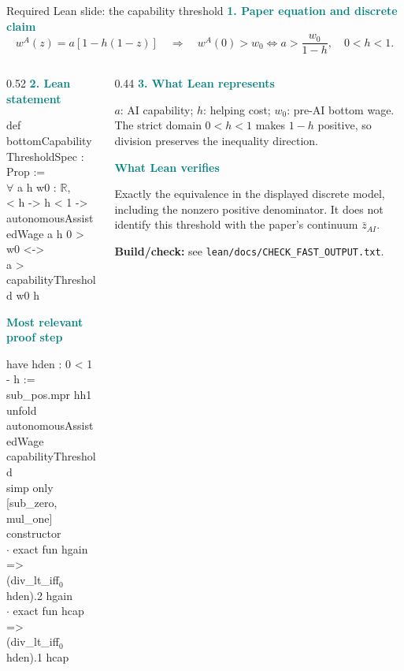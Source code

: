 \documentclass[aspectratio=169,11pt]{beamer}
\newcommand{\key}[1]{\textcolor{Teal}{\textbf{#1}}}
\begin{document}
\begin{frame}{Required Lean slide: the capability threshold}
\scriptsize
  \key{1. Paper equation and discrete claim}
  \[
  w^A(z)=a[1-h(1-z)]
  \quad\Longrightarrow\quad
  w^A(0)>w_0
  \iff
a>\frac{w_0}{1-h},
\quad 0<h<1.
\]

\begin{columns}[T,totalwidth=\textwidth]
\begin{column}{0.52\textwidth}
  \key{2. Lean statement}
  \vspace{0.05cm}

  {\ttfamily\fontsize{7.5}{8.7}\selectfont
  def bottomCapabilityThresholdSpec : Prop :=\\
  \quad $\forall$ a h w0 : $\mathbb{R}$,\\
   < h -> h < 1 ->\\
  \qquad autonomousAssistedWage a h 0 > w0 <->\\
  \qquad\quad a > capabilityThreshold w0 h
  }

  \vspace{0.10cm}
  \key{Most relevant proof step}
  \vspace{0.05cm}

  {\ttfamily\fontsize{7.5}{8.7}\selectfont
  have hden : 0 < 1 - h := sub\_pos.mpr hh1\\
  unfold autonomousAssistedWage capabilityThreshold\\
  simp only [sub\_zero, mul\_one]\\
  constructor\\
  \quad $\cdot$ exact fun hgain =>\\
  \qquad (div\_lt\_iff$_0$ hden).2 hgain\\
  \quad $\cdot$ exact fun hcap =>\\
  \qquad (div\_lt\_iff$_0$ hden).1 hcap
  }
\end{column}
\begin{column}{0.44\textwidth}
  \key{3. What Lean represents}

  $a$: AI capability; $h$: helping cost; $w_0$: pre-AI bottom wage.
  The strict domain $0<h<1$ makes $1-h$ positive, so division preserves the
  inequality direction.

  \vspace{0.14cm}
  \key{What Lean verifies}

  Exactly the equivalence in the displayed discrete model, including the
  nonzero positive denominator. It does not identify this threshold with the
  paper's continuum \(\bar z_{AI}\).

  \vspace{0.14cm}
  \textbf{Build/check:} see \texttt{lean/docs/CHECK\_FAST\_OUTPUT.txt}.
\end{column}
\end{columns}
\end{frame}
\end{document}
